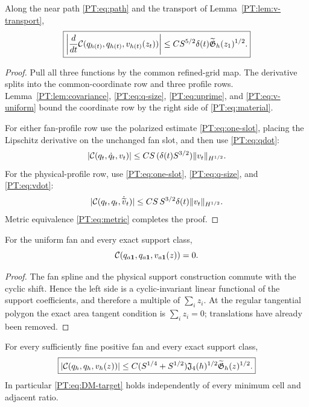 \begin{proposition}
\label{PT:prop:material}
Along the near path \eqref{PT:eq:path} and the transport of
Lemma~\ref{PT:lem:v-transport},
\begin{equation}\label{PT:eq:material}
 \boxed{
 \left|\frac d{dt}
 \mathcal C(q_{h(t)},q_{h(t)},v_{h(t)}(z_t))\right|
 \le CS^{5/2}\delta(t)\widetilde{\mathfrak G}_h(z_1)^{1/2}.}
\end{equation}
\end{proposition}

\begin{proof}
Pull all three functions by the common refined-grid map.  The derivative
splits into the common-coordinate row and three profile rows.
Lemma~\ref{PT:lem:covariance}, \eqref{PT:eq:q-size},
\eqref{PT:eq:uprime}, and \eqref{PT:eq:v-uniform} bound the coordinate row by
the right side of \eqref{PT:eq:material}.

For either fan-profile row use the polarized estimate
\eqref{PT:eq:one-slot}, placing the Lipschitz derivative on the unchanged
fan slot, and then use \eqref{PT:eq:qdot}:
\[
 |\mathcal C(q_t,\dot q_t,v_t)|
 \le C S\,(\delta(t)S^{3/2})\|v_t\|_{H^{1/2}}.
\]
For the physical-profile row, use \eqref{PT:eq:one-slot},
\eqref{PT:eq:q-size}, and \eqref{PT:eq:vdot}:
\[
 |\mathcal C(q_t,q_t,\dot{\widetilde v}_t)|
 \le C S\,S^{3/2}\delta(t)\|v_t\|_{H^{1/2}}.
\]
Metric equivalence \eqref{PT:eq:metric} completes the proof.
\end{proof}

\begin{lemma}\label{PT:lem:regular}
For the uniform fan and every exact support class,
\begin{equation}\label{PT:eq:regular}
 \mathcal C(q_{a\mathbf1},q_{a\mathbf1},v_{a\mathbf1}(z))=0.
\end{equation}
\end{lemma}

\begin{proof}
The fan spline and the physical support construction commute with the
cyclic shift.  Hence the left side is a cyclic-invariant linear functional
of the support coefficients, and therefore a multiple of $\sum_i z_i$.
At the regular tangential polygon the exact area tangent condition is
$\sum_i z_i=0$; translations have already been removed.
\end{proof}

\begin{theorem}\label{PT:thm:DM}
For every sufficiently fine positive fan and every exact support class,
\begin{equation}\label{PT:eq:DM}
 \boxed{
 |\mathcal C(q_h,q_h,v_h(z))|
 \le C(S^{1/4}+S^{1/2})\mathfrak J_4(h)^{1/2}
       \widetilde{\mathfrak G}_h(z)^{1/2}.}
\end{equation}
In particular \eqref{PT:eq:DM-target} holds independently of every minimum
cell and adjacent ratio.
\end{theorem}

